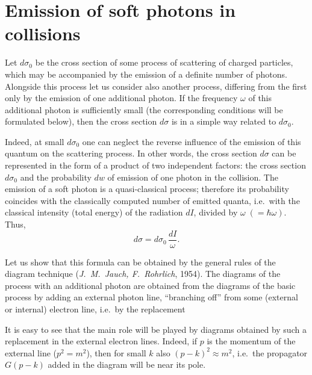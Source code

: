 
\section{Emission of soft photons in collisions}


Let $d\sigma_0$ be the cross section of some process of scattering of charged particles, which may be accompanied by the emission of a definite number of photons. Alongside this process let us consider also another process, differing from the first only by the emission of one additional photon. If the frequency $\omega$ of this additional photon is sufficiently small (the corresponding conditions will be formulated below), then the cross section $d\sigma$ is in a simple way related to $d\sigma_0$.

Indeed, at small $d\sigma_0$ one can neglect the reverse influence of the emission of this quantum on the scattering process. In other words, the cross section $d\sigma$ can be represented in the form of a product of two independent factors: the cross section $d\sigma_0$ and the probability $dw$ of emission of one photon in the collision. The emission of a soft photon is a quasi-classical process; therefore its probability coincides with the classically computed number of emitted quanta, i.e.\ with the classical intensity (total energy) of the radiation $dI$, divided by $\omega\;(= \hbar\omega)$. Thus,
\begin{equation}
d\sigma = d\sigma_0\,\frac{dI}{\omega}.
\label{eq:98.1}
\end{equation}

Let us show that this formula can be obtained by the general rules of the diagram technique (\emph{J.~M.~Jauch, F.~Rohrlich}, 1954). The diagrams of the process with an additional photon are obtained from the diagrams of the basic process by adding an external photon line, ``branching off'' from some (external or internal) electron line, i.e.\ by the replacement



It is easy to see that the main role will be played by diagrams obtained by such a replacement in the external electron lines. Indeed, if $p$ is the momentum of the external line ($p^2 = m^2$), then for small $k$ also $(p - k)^2 \approx m^2$, i.e.\ the propagator $G(p - k)$ added in the diagram will be near its pole.

